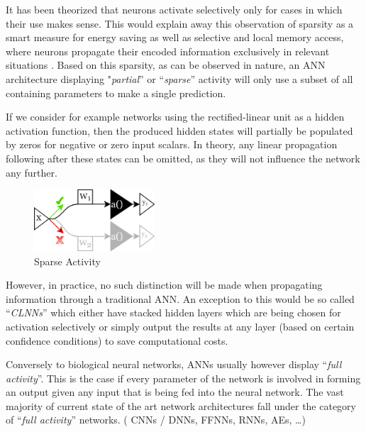 It has been theorized that neurons activate selectively only for cases in which their use makes sense. This would explain away this observation of sparsity as a smart measure for energy saving \cite{19_cost-of-cortical-computation} as well as selective and local memory access, where neurons propagate their encoded information exclusively in relevant situations \cite{7_dorment-brain_2015}.
Based on this sparsity, as can be observed in nature, an \acs{ANN} architecture displaying "\textit{partial}” or “\textit{sparse}” activity will only use a subset of all containing parameters to make a single prediction. \linebreak

If we consider for example networks using the rectified-linear unit as a hidden activation function, then the produced hidden states will partially be populated by zeros for negative or zero input scalars. In theory, any linear propagation following after these states can be omitted, as they will not influence the network any further. \cite[p.1, p.8]{23_low-rank-conditional-davis2014}

\begin{figure}
    \centering 
    \includegraphics[width=0.40\textwidth]{PICs/sparse-activity.png}
    \caption{Sparse Activity}
\end{figure}

However, in practice, no such distinction will be made when propagating 
information through a traditional \acs{ANN}.
An exception to this would be so called “\textit{\acp{CLNN}}” which either have stacked hidden layers which are being chosen for activation selectively or simply output the results at any layer (based on certain confidence conditions) to save computational costs.
\cite[p. 1]{8_CDL-4-efficient_2015}


Conversely to biological neural networks,  \acp{ANN} usually however display “\textit{full activity}”.
This is the case if every parameter of the network is involved in forming an output given any input that is being fed into the neural network.
The vast majority of current state of the art network architectures fall under the category of “\textit{full activity}” networks. ( \acp{CNN} / DNNs, FFNNs,  \acp{RNN},  \acp{AE}, …)
 

